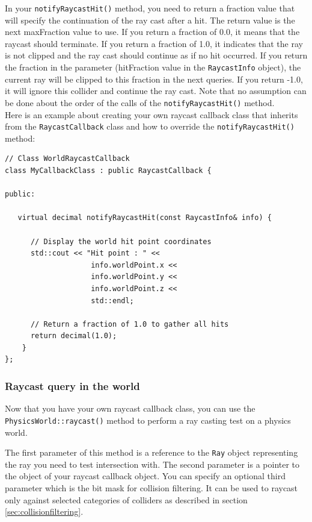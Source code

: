 \documentclass[a4paper,12pt]{article}
\begin{document}
    In your \texttt{notifyRaycastHit()} method, you need to return a fraction value that will specify the continuation of the ray cast after a hit.
    The return value is the next maxFraction value to use. If you return a fraction of 0.0, it means that the raycast should terminate. If you return a
    fraction of 1.0, it indicates that the ray is not clipped and the ray cast should continue as if no hit occurred. If you return the fraction in the
    parameter (hitFraction value in the \texttt{RaycastInfo} object), the current ray will be clipped to this fraction in the next queries. If you return -1.0, it will
    ignore this collider and continue the ray cast. Note that no assumption can be done about the order of the calls of the \texttt{notifyRaycastHit()} method. \\

    Here is an example about creating your own raycast callback class that inherits from the \texttt{RaycastCallback} class and how to override the
    \texttt{notifyRaycastHit()} method: \\

    \begin{lstlisting}
// Class WorldRaycastCallback
class MyCallbackClass : public RaycastCallback {

public:

   virtual decimal notifyRaycastHit(const RaycastInfo& info) {

      // Display the world hit point coordinates
      std::cout << "Hit point : " <<
                    info.worldPoint.x <<
                    info.worldPoint.y <<
                    info.worldPoint.z <<
                    std::endl;

      // Return a fraction of 1.0 to gather all hits
      return decimal(1.0);
    }
};
  \end{lstlisting}

    \subsubsection{Raycast query in the world}

    \begin{sloppypar} 
    Now that you have your own raycast callback class, you can use the \texttt{PhysicsWorld::raycast()} method to perform a ray casting test
    on a physics world. \\
    \end{sloppypar} 

    The first parameter of this method is a reference to the \texttt{Ray} object representing the ray you need to test intersection with. The second parameter is a pointer to
    the object of your raycast callback object. You can specify an optional third parameter which is the bit mask for collision filtering.
    It can be used to raycast only against selected categories of colliders as described in section \ref{sec:collisionfiltering}. \\
\end{document}
